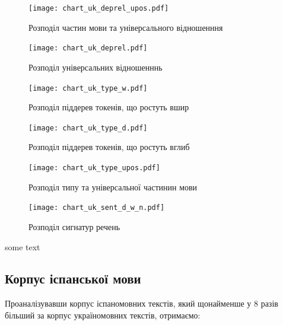 \begin{figure}[ht]
  \begin{center}
    \texttt{[image: chart\_uk\_deprel\_upos.pdf]}
  \end{center}
  \caption{Розподіл частин мови та універсального відношенння}
  \label{img:uk_deprel_upos}
\end{figure}

\newpage

\begin{multicols}{2}
\begin{figure}[H]
  \begin{center}
    \texttt{[image: chart\_uk\_deprel.pdf]}
  \end{center}
  \caption{Розподіл універсальних відношенннь}
  \label{img:uk0}
\end{figure}

\begin{figure}[H]
  \begin{center}
    \texttt{[image: chart\_uk\_type\_w.pdf]}
  \end{center}
  \caption{Розподіл піддерев токенів, що ростуть вшир}
  \label{img:uk3}
\end{figure}

\begin{figure}[H]
  \begin{center}
    \texttt{[image: chart\_uk\_type\_d.pdf]}
  \end{center}
  \caption{Розподіл піддерев токенів, що ростуть вглиб}
  \label{img:uk4}
\end{figure}

\begin{figure}[H]
  \begin{center}
    \texttt{[image: chart\_uk\_type\_upos.pdf]}
  \end{center}
  \caption{Розподіл типу та універсальної частинин мови}
  \label{img:uk5}
\end{figure}

\begin{figure}[H]
  \begin{center}
    \texttt{[image: chart\_uk\_sent\_d\_w\_n.pdf]}
  \end{center}
  \caption{Розподіл сигнатур речень}
  \label{img:uk6}
\end{figure}
\end{multicols}


some text

\subsection{Корпус іспанської мови}
Проаналізувавши корпус іспаномовних текстів, який щонайменше у 8 разів
більший за корпус україномовних текстів, отримаємо:

